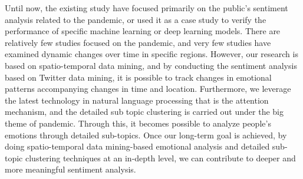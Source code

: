 Until now, the existing study have focused primarily on the public's
sentiment analysis related to the pandemic, or used it as a case study to
verify the performance of specific machine learning or deep learning models.
There are relatively few studies focused on the pandemic, and very few
studies have examined dynamic changes over time in specific regions. However,
our research is based on spatio-temporal data mining, and by conducting the
sentiment analysis based on Twitter data mining, it is possible to track
changes in emotional patterns accompanying changes in time and location.
Furthermore, we leverage the latest technology in natural language processing
that is the attention mechanism, and the detailed sub topic clustering is
carried out under the big theme of pandemic. Through this, it becomes
possible to analyze people's emotions through detailed sub-topics. Once our
long-term goal is achieved, by doing spatio-temporal data mining-based
emotional analysis and detailed sub-topic clustering techniques at an
in-depth level, we can contribute to deeper and more meaningful sentiment
analysis. 